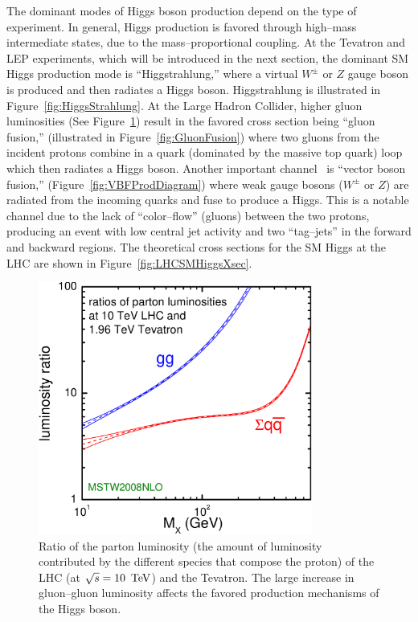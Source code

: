 The dominant modes of Higgs boson production depend on the type of experiment.
In general, Higgs production is favored through high--mass intermediate states,
due to the mass--proportional coupling.  At the Tevatron and LEP experiments,
which will be introduced in the next section, the dominant SM Higgs production
mode is ``Higgstrahlung,'' where a virtual $W^\pm$ or $Z$ gauge boson is
produced and then radiates a Higgs boson.  Higgstrahlung is illustrated in
Figure~\ref{fig:HiggsStrahlung}.  At the Large Hadron Collider, higher gluon
luminosities (See Figure~\ref{fig:GluonLumiRatio}) result in the favored cross
section being ``gluon fusion,'' (illustrated in Figure~\ref{fig:GluonFusion})
where two gluons from the incident protons combine in a quark (dominated by the
massive top quark) loop which then radiates a Higgs boson.  Another important
channel~\cite{Rainwater:1998kj} is ``vector boson fusion,''
(Figure~\ref{fig:VBFProdDiagram}) where weak gauge bosons ($W^\pm$ or $Z$) are
radiated from the incoming quarks and fuse to produce a Higgs.  This is a
notable channel due to the lack of ``color--flow'' (gluons) between the two
protons, producing an event with low central jet activity and two ``tag--jets''
in the forward and backward regions.  The theoretical cross sections for the SM
Higgs at the LHC are shown in Figure~\ref{fig:LHCSMHiggsXsec}.
\begin{figure}
  \centering
  \includegraphics[width=90mm,angle=0]{theory_chapter/figures/parton_lumis_10TeV_vs_2TeV.pdf}
  \caption[Parton luminosity comparison of the LHC and Tevatron]{Ratio of the
  parton luminosity (the amount of luminosity contributed by the different
  species that compose the proton) of the LHC (at $\sqrt s = 10~\,\text{Te\hspace{-.08em}V}$) and the
  Tevatron.  The large increase in gluon--gluon luminosity affects the favored
  production mechanisms of the Higgs boson.  } \label{fig:GluonLumiRatio}
\end{figure}
